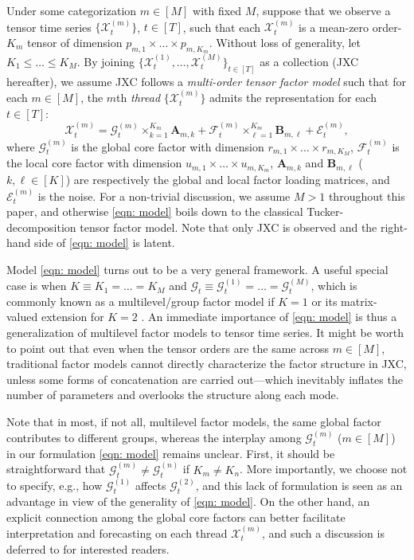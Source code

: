 \documentclass[aos]{imsart}
\theoremstyle{plain}
\theoremstyle{definition}
\def\cE{\mathcal{E}}
\def\cF{\mathcal{F}}
\def\cG{\mathcal{G}} \def\cH{\boldsymbol{\mathcal{H}}} \def\cI{\mathcal{I}}
\def\cX{\mathcal{X}}
\def\bA{\mathbf{A}}
\def\bB{\mathbf{B}}
\begin{document}
Under some categorization $m\in[M]$ with fixed $M$, suppose that we observe a tensor time series $\{\cX_t^{(m)}\}$, $t\in[T]$, such that each $\cX_t^{(m)}$ is a mean-zero order-$K_m$ tensor of dimension $p_{m,1}\times \dots \times p_{m,K_m}$. Without loss of generality, let $K_1\leq \dots\leq K_M$. By joining $\{ \cX_t^{(1)}, \dots,\cX_t^{(M)} \}_{t\in[T]}$ as a collection (JXC hereafter), we assume JXC follows a \textit{multi-order tensor factor model} such that for each $m\in[M]$, the $m$th \textit{thread} $\{\cX_t^{(m)}\}$ admits the representation for each $t\in[T]$:
\begin{equation}
\label{eqn: model}
\cX_t^{(m)} = \cG_t^{(m)} \times_{k=1}^{K_m} \bA_{m,k} + \cF_t^{(m)} \times_{\ell=1}^{K_m} \bB_{m,\ell} + \cE_t^{(m)} ,
\end{equation}
where $\cG_t^{(m)}$ is the global core factor with dimension $r_{m,1}\times \dots\times r_{m,K_M}$, $\cF_t^{(m)}$ is the local core factor with dimension $u_{m,1}\times \dots\times u_{m,K_m}$, $\bA_{m,k}$ and $\bB_{m,\ell}$ ($k,\ell\in[K]$) are respectively the global and local factor loading matrices, and $\cE_t^{(m)}$ is the noise. For a non-trivial discussion, we assume $M>1$ throughout this paper, and otherwise \eqref{eqn: model} boils down to the classical Tucker-decomposition tensor factor model. Note that only JXC is observed and the right-hand side of \eqref{eqn: model} is latent.


Model \eqref{eqn: model} turns out to be a very general framework. A useful special case is when $K\equiv K_1=\dots =K_M$ and $\cG_t\equiv \cG_t^{(1)} =\dots=\cG_t^{(M)}$, which is commonly known as a multilevel/group factor model if $K=1$ \citep{Choietal2018, Huetal2025} or its matrix-valued extension for $K=2$ \citep{Zhangetal2025}. An immediate importance of \eqref{eqn: model} is thus a generalization of multilevel factor models to tensor time series. It might be worth to point out that even when the tensor orders are the same across $m\in[M]$, traditional factor models cannot directly characterize the factor structure in JXC, unless some forms of concatenation are carried out---which inevitably inflates the number of parameters and overlooks the structure along each mode.

Note that in most, if not all, multilevel factor models, the same global factor contributes to different groups, whereas the interplay among $\cG_t^{(m)}$ ($m\in[M]$) in our formulation \eqref{eqn: model} remains unclear. First, it should be straightforward that $\cG_t^{(m)} \neq \cG_t^{(n)}$ if $K_m\neq K_n$. More importantly, we choose not to specify, e.g., how $\cG_t^{(1)}$ affects $\cG_t^{(2)}$, and this lack of formulation is seen as an advantage in view of the generality of \eqref{eqn: model}. On the other hand, an explicit connection among the global core factors can better facilitate interpretation and forecasting on each thread $\cX_t^{(m)}$, and such a discussion is deferred to  for interested readers.
\end{document}
